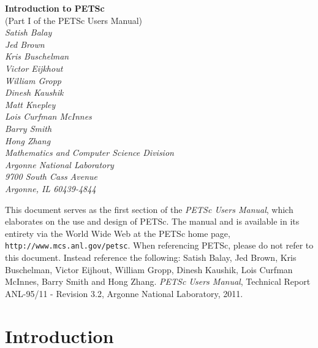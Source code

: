 \documentclass[twoside,12pt]{../sty/report_petsc}
\begin{document}
\begin{center}
$\!$
\vspace{1.0cm}
\thispagestyle{empty}

{\huge \bf Introduction to PETSc}\\ 
\vspace{0.5cm}
{\LARGE (Part I of the PETSc Users Manual)} \\
\vspace{1.5cm}
{\large \em Satish Balay\\Jed Brown\\Kris Buschelman\\Victor Eijkhout\\William Gropp\\Dinesh Kaushik\\Matt Knepley\\Lois Curfman McInnes\\Barry Smith\\Hong Zhang\\
\medskip \medskip
Mathematics and Computer Science Division\\
Argonne National Laboratory\\
9700 South Cass Avenue\\
Argonne, IL 60439-4844\\
}
\end{center}

\vspace{1.0cm}



 This document serves as the first section of the {\em PETSc Users
Manual}, which elaborates on the use and design of PETSc. The
manual and is available in its entirety via the World Wide Web at
the PETSc home page, {\tt http://www.mcs.anl.gov/petsc}.
When referencing PETSc, please do 
not refer to this document. Instead reference the following: Satish
Balay, Jed Brown, Kris Buschelman, Victor Eijhout, William Gropp, Dinesh Kaushik,
Lois Curfman McInnes, Barry Smith and Hong Zhang.  {\em
PETSc Users Manual}, Technical Report ANL-95/11 - Revision 3.2,
Argonne National Laboratory, 2011.

%
\newpage


\newpage
\section{Introduction}

\end{document}

